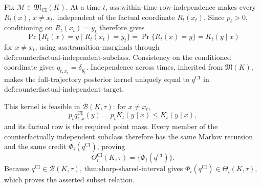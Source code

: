 Fix \(\mathcal M\in\mathfrak M_{\mathrm{CI}}(K)\).  At a time \(t\), \(\text{ass:within-time-row-independence}\) makes every \(R_t(x)\), \(x\ne x_t\), independent of the factual coordinate \(R_t(x_t)\).  Since \(p_t>0\), conditioning on \(R_t(x_t)=y_t\) therefore gives
\[
 \Pr\{R_t(x)=y\mid R_t(x_t)=y_t\}
 =\Pr\{R_t(x)=y\}=K_t(y\mid x)
\]
for \(x\ne x_t\), using \(\text{ass:transition-marginals}\) through \(\text{def:counterfactual-independent-subclass}\).  Consistency on the conditioned coordinate gives \(q_{t,x_t}=\delta_{y_t}\).  Independence across times, inherited from \(\mathfrak M(K)\), makes the full-trajectory posterior kernel uniquely equal to \(q^{\mathrm{CI}}\) in \(\text{def:counterfactual-independent-target}\).

This kernel is feasible in \(\mathcal B(K,\tau)\): for \(x\ne x_t\),
\[
 p_tq_{t,x}^{\mathrm{CI}}(y)=p_tK_t(y\mid x)\le K_t(y\mid x),
\]
and its factual row is the required point mass.  Every member of the counterfactually independent subclass therefore has the same Markov recursion and the same credit \(\Phi_i(q^{\mathrm{CI}})\), proving
\[
 \Theta_i^{\mathrm{CI}}(K,\tau)=\{\Phi_i(q^{\mathrm{CI}})\}.
\]
Because \(q^{\mathrm{CI}}\in\mathcal B(K,\tau)\), \(\text{thm:sharp-shared-interval}\) gives \(\Phi_i(q^{\mathrm{CI}})\in\Theta_i(K,\tau)\), which proves the asserted subset relation.